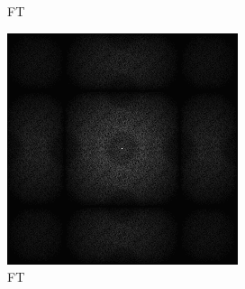 \begin{figure}[H]
\begin{tcolorbox}[boxrule=4pt,sharp corners=downhill,title=Szene unter Kamerabewegung, fonttitle=\bfseries]
\begin{tcolorbox}[boxrule=4pt,sharp corners=downhill,title=Projektion,colbacktitle=green!50!white, coltitle=black]
\begin{subfigure}[b]{0.2\linewidth}
      \caption{FT}
      \label{pic:TemporalRepr_2_FFT}
    \end{subfigure}
    \begin{subfigure}[b]{0.2\linewidth}
      \includegraphics[width=\linewidth]{content/TemporalerAlg/Bilder/Reprojection/TemporalRepr/Ausschnitte/Ausschnitt3_FFT.png}
      \caption{FT}
      \label{pic:TemporalRepr_3_FFT}
    \end{subfigure}
    \begin{subfigure}[b]{0.2\linewidth}

\end{subfigure}
\end{tcolorbox}
\end{tcolorbox}
\end{figure}
